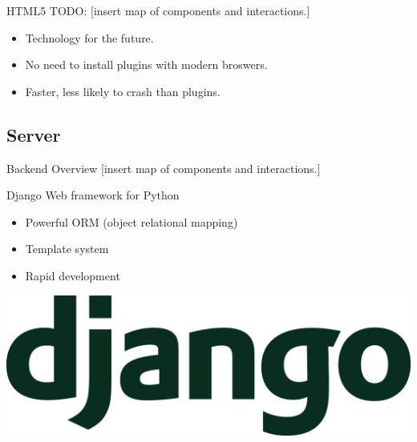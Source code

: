 \documentclass{beamer}
\begin{document}
\begin{frame}{HTML5}
  TODO:
  [insert map of components and interactions.]
  \begin{itemize}
    \item Technology for the future.
    \item No need to install plugins with modern broswers.
    \item Faster, less likely to crash than plugins.
  \end{itemize}
\end{frame}

\subsection{Server}

\begin{frame}{Backend Overview}
  [insert map of components and interactions.]
\end{frame}

\begin{frame}{Django}
  Web framework for Python
  \begin{itemize}
    \item Powerful ORM (object relational mapping)
    \item Template system
    \item Rapid development
  \end{itemize}
  \vspace{\baselineskip}
  \begin{center}
    \includegraphics[scale=0.05]{django.png} \\
  \end{center}
\end{frame}
\end{document}
